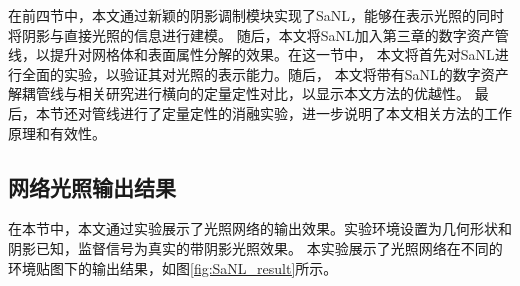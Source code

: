 在前四节中，本文通过新颖的阴影调制模块实现了SaNL，能够在表示光照的同时将阴影与直接光照的信息进行建模。
随后，本文将SaNL加入第三章的数字资产管线，以提升对网格体和表面属性分解的效果。在这一节中，
本文将首先对SaNL进行全面的实验，以验证其对光照的表示能力。随后，
本文将带有SaNL的数字资产解耦管线与相关研究进行横向的定量定性对比，以显示本文方法的优越性。
最后，本节还对管线进行了定量定性的消融实验，进一步说明了本文相关方法的工作原理和有效性。

\subsection{网络光照输出结果}
在本节中，本文通过实验展示了光照网络的输出效果。实验环境设置为几何形状和阴影已知，监督信号为真实的带阴影光照效果。
本实验展示了光照网络在不同的环境贴图下的输出结果，如图\ref{fig:SaNL_result}所示。

